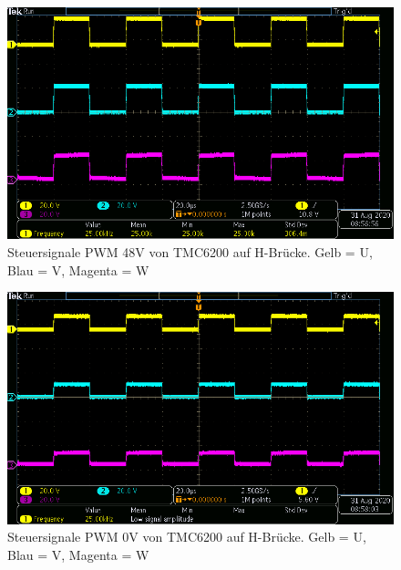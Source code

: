 \begin{figure}[H]
\center
\includegraphics[width = \textwidth]{graphics/TMC6200_Gate_Signal_H}
\caption{Steuersignale PWM 48V von TMC6200 auf H-Brücke. Gelb = U, Blau = V, Magenta = W}
\label{fig:TMC6200_Gate_Signal_H}
\end{figure}

\begin{figure}[H]
\center
\includegraphics[width = \textwidth]{graphics/TMC6200_Gate_Signal_L}
\caption{Steuersignale PWM 0V von TMC6200 auf H-Brücke. Gelb = U, Blau = V, Magenta = W}
\label{fig:TMC6200_Gate_Signal_L}
\end{figure}
